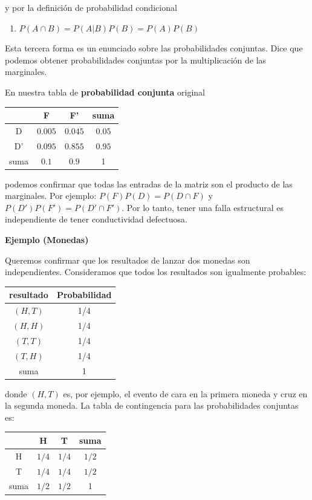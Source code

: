 \documentclass[
]{book}
\providecommand{\tightlist}{%
  \setlength{\itemsep}{0pt}\setlength{\parskip}{0pt}}
\begin{document}
y por la definición de probabilidad condicional

\begin{enumerate}
\def\labelenumi{\arabic{enumi})}
\setcounter{enumi}{2}
\tightlist
\item
  \(P(A\cap B)=P(A|B)P(B)=P(A)P(B)\)
\end{enumerate}

Esta tercera forma es un enunciado sobre las probabilidades conjuntas. Dice que podemos obtener probabilidades conjuntas por la multiplicación de las marginales.

En nuestra tabla de \textbf{probabilidad conjunta} original

\begin{longtable}[]{@{}cccc@{}}
\toprule\noalign{}
& F & F' & suma \\
\midrule\noalign{}
\endhead
\bottomrule\noalign{}
\endlastfoot
D & \(0.005\) & \(0.045\) & \(0.05\) \\
D' & \(0.095\) & \(0.855\) & \(0.95\) \\
suma & \(0.1\) & \(0.9\) & 1 \\
\end{longtable}

podemos confirmar que todas las entradas de la matriz son el producto de las marginales. Por ejemplo: \(P(F)P(D)= P(D \cap F)\) y \(P(D')P(F')=P(D' \cap F')\). Por lo tanto, tener una falla estructural es independiente de tener conductividad defectuosa.

\textbf{Ejemplo (Monedas)}

Queremos confirmar que los resultados de lanzar dos monedas son independientes. Consideramos que todos los resultados son igualmente probables:

\begin{longtable}[]{@{}cc@{}}
\toprule\noalign{}
resultado & Probabilidad \\
\midrule\noalign{}
\endhead
\bottomrule\noalign{}
\endlastfoot
\((H,T)\) & 1/4 \\
\((H,H)\) & 1/4 \\
\((T,T)\) & 1/4 \\
\((T,H)\) & 1/4 \\
suma & 1 \\
\end{longtable}

donde \((H,T)\) es, por ejemplo, el evento de cara en la primera moneda y cruz en la segunda moneda. La tabla de contingencia para las probabilidades conjuntas es:

\begin{longtable}[]{@{}cccc@{}}
\toprule\noalign{}
& H & T & suma \\
\midrule\noalign{}
\endhead
\bottomrule\noalign{}
\endlastfoot
H & \(1/4\) & \(1/4\) & \(1/2\) \\
T & \(1/4\) & \(1/4\) & \(1/2\) \\
suma & \(1/2\) & \(1/2\) & 1 \\
\end{longtable}
\end{document}

